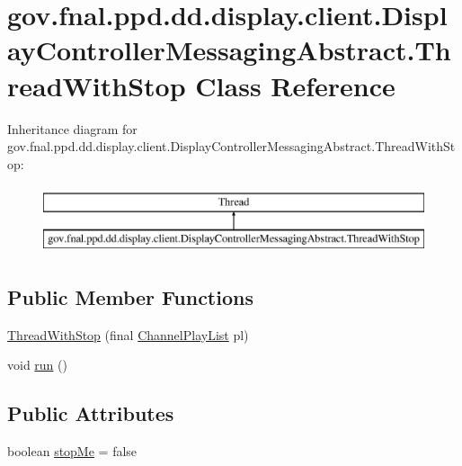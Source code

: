 \hypertarget{classgov_1_1fnal_1_1ppd_1_1dd_1_1display_1_1client_1_1DisplayControllerMessagingAbstract_1_1ThreadWithStop}{\section{gov.\-fnal.\-ppd.\-dd.\-display.\-client.\-Display\-Controller\-Messaging\-Abstract.\-Thread\-With\-Stop Class Reference}
\label{classgov_1_1fnal_1_1ppd_1_1dd_1_1display_1_1client_1_1DisplayControllerMessagingAbstract_1_1ThreadWithStop}
}
Inheritance diagram for gov.\-fnal.\-ppd.\-dd.\-display.\-client.\-Display\-Controller\-Messaging\-Abstract.\-Thread\-With\-Stop\-:\begin{figure}[H]
\begin{center}
\leavevmode
\includegraphics[height=2.000000cm]{classgov_1_1fnal_1_1ppd_1_1dd_1_1display_1_1client_1_1DisplayControllerMessagingAbstract_1_1ThreadWithStop}
\end{center}
\end{figure}
\subsection*{Public Member Functions}
\begin{DoxyCompactItemize}
\item 
\hyperlink{classgov_1_1fnal_1_1ppd_1_1dd_1_1display_1_1client_1_1DisplayControllerMessagingAbstract_1_1ThreadWithStop_aebe2e9dec1d69ac75d74ebcc867ed921}{Thread\-With\-Stop} (final \hyperlink{classgov_1_1fnal_1_1ppd_1_1dd_1_1channel_1_1ChannelPlayList}{Channel\-Play\-List} pl)
\item 
void \hyperlink{classgov_1_1fnal_1_1ppd_1_1dd_1_1display_1_1client_1_1DisplayControllerMessagingAbstract_1_1ThreadWithStop_a3a8072938a59f88b0b1a62775ef1809b}{run} ()
\end{DoxyCompactItemize}
\subsection*{Public Attributes}
\begin{DoxyCompactItemize}
\item 
boolean \hyperlink{classgov_1_1fnal_1_1ppd_1_1dd_1_1display_1_1client_1_1DisplayControllerMessagingAbstract_1_1ThreadWithStop_a0b29b8779d6f9c197704bc33bbac3efb}{stop\-Me} = false
\end{DoxyCompactItemize}


